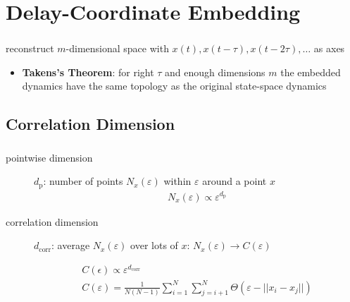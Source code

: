 \begin{frame}
\begin{figure}
\begin{subfigure}[b]{0.3\textwidth}
  \end{subfigure}
\end{figure}
\end{frame}

\section{Delay-Coordinate Embedding}
\begin{frame}
  \frametitle{\insertsectionhead}
  \framesubtitle{\insertsubsectionhead}
  reconstruct $m$-dimensional space with $x(t), x(t-\tau), x(t-2\tau), \ldots$ as axes
  \begin{itemize}
    \item \textbf{Takens's Theorem}: for right $\tau$ and enough dimensions $m$ the embedded dynamics have the same topology as the original state-space dynamics
  \end{itemize}
\end{frame}

\subsection{Correlation Dimension}
\begin{frame}
  \frametitle{\insertsectionhead}
  \framesubtitle{\insertsubsectionhead}

\begin{description}
  \item[pointwise dimension] 

  $d_\mathrm{p}$: number of points $N_x(\varepsilon)$ within $\varepsilon$ around a point $x$
\begin{gather*}
N_x(\varepsilon) \propto \varepsilon^{d_\mathrm{p}}
\end{gather*}
\item[correlation dimension]
$d_\mathrm{corr}$: average $N_x(\varepsilon)$ over lots of $x$: $N_x(\varepsilon)\to C(\varepsilon)$

\begin{gather*}
C(\epsilon) \propto \varepsilon^{d_\text{corr}}\\
C(\varepsilon) =\frac{1}{N(N-1)} \sum_{i=1}^N\sum_{j=i+1}^N \Theta(\varepsilon-||x_i-x_j||)\\
\end{gather*}

\end{description}
\end{frame}

